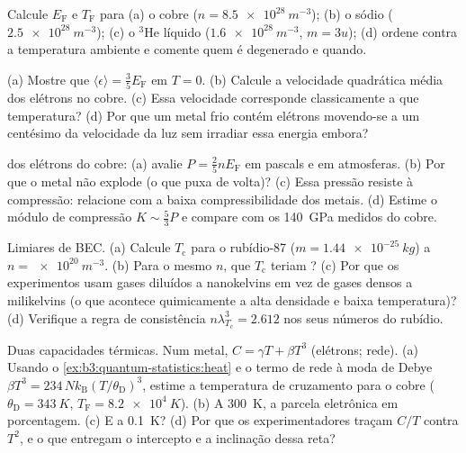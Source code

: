 \begin{exercise}[$\star$]\label{exo:b3:quantum-statistics:1}
Calcule $E_{\text{F}}$ e $T_{\text{F}}$ para (a) o cobre
($n = \qty{8.5e28}{m^{-3}}$); (b) o sódio ($\qty{2.5e28}{m^{-3}}$);
(c) o $^3$He líquido ($\qty{1.6e28}{m^{-3}}$, $m = 3u$); (d) ordene
contra a temperatura ambiente e comente quem é degenerado e quando.
\end{exercise}

\begin{exercise}[$\star$]\label{exo:b3:quantum-statistics:2}
(a) Mostre que $\langle\epsilon\rangle = \tfrac35 E_{\text{F}}$ em $T =
0$. (b) Calcule a velocidade quadrática média dos elétrons no cobre. (c)
Essa velocidade corresponde classicamente a que temperatura? (d) Por que
um metal frio contém elétrons movendo-se a um centésimo da velocidade da
luz sem irradiar essa energia embora?
\end{exercise}

\begin{exercise}[$\star$]\label{exo:b3:quantum-statistics:3}
 dos elétrons do cobre: (a) avalie $P =
\tfrac25 nE_{\text{F}}$ em pascals e em atmosferas. (b) Por que
o metal não explode (o que puxa de volta)? (c) Essa pressão resiste à
compressão: relacione com a baixa compressibilidade dos metais. (d)
Estime o módulo de compressão $K \sim \tfrac53 P$ e compare com os
\qty{140}{GPa} medidos do cobre.
\end{exercise}

\begin{exercise}[$\star$]\label{exo:b3:quantum-statistics:4}
Limiares de BEC. (a) Calcule $T_{\text{c}}$ para o rubídio-87 ($m =
\qty{1.44e-25}{kg}$) a $n = \qty{e20}{m^{-3}}$. (b) Para o mesmo
$n$, que $T_{\text{c}}$ teriam ? (c) Por que os
experimentos usam gases diluídos a nanokelvins em vez de gases
densos a milikelvins (o que acontece quimicamente a alta densidade e
baixa temperatura)? (d) Verifique a regra de consistência $n\lambda_{T_c}^3
= 2.612$ nos seus números do rubídio.
\end{exercise}

\begin{exercise}[$\star\star$]\label{exo:b3:quantum-statistics:5}
Duas capacidades térmicas. Num metal, $C = \gamma T +
\beta T^3$ (elétrons; rede). (a) Usando o
\cref{ex:b3:quantum-statistics:heat} e o termo de rede à moda de Debye
$\beta T^3 = 234\,Nk_{\text{B}}(T/\theta_{\text{D}})^3$,
estime a temperatura de cruzamento para o cobre
($\theta_{\text{D}} = \qty{343}{K}$, $T_{\text{F}} =
\qty{8.2e4}{K}$). (b) A \qty{300}{K}, a parcela eletrônica em
porcentagem. (c) E a \qty{0.1}{K}? (d) Por que os experimentadores
traçam $C/T$ contra $T^2$, e o que entregam o intercepto e a
inclinação dessa reta?
\end{exercise}

